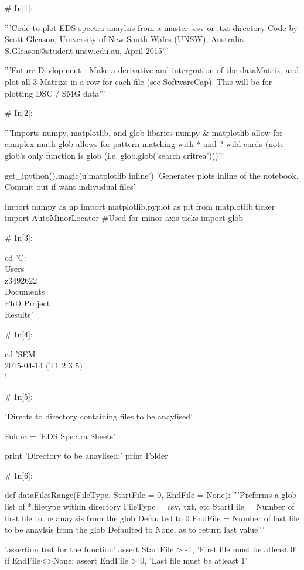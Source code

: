 \documentclass[a4paper,8pt]{article}
\begin{document}
\begin{python}
# In[1]:

'''Code to plot EDS spectra anaylsis from a master .csv or .txt directory
Code by Scott Gleason, University of New South Wales (UNSW), Australia 
S.Gleason@student.unsw.edu.au, April 2015'''

'''Future Devlopment - Make a derivative and intergration of the dataMatrix,
and plot all 3 Matrixs in a row for each file (see SoftwareCap). 
This will be for plotting DSC / SMG data'''


# In[2]:

'''Imports numpy, matplotlib, and glob libaries 
numpy & matplotlib allow for complex math
glob allows for pattern matching with * and ? wild cards
(note glob's only function is glob (i.e. glob.glob('search critrea')))'''

get_ipython().magic(u'matplotlib inline')
'Generates plots inline of the notebook. Commit out if want indivudual files'

import numpy as np
import matplotlib.pyplot as plt
from matplotlib.ticker import AutoMinorLocator #Used for minor axis ticks
import glob


# In[3]:

cd 'C:\\Users\\z3492622\\Documents\\PhD Project\\Results'


# In[4]:

cd 'SEM\\2015-04-14 (T1 2 3 5)\\'


# In[5]:

'Directs to directory containing files to be anaylised'

Folder = 'EDS Spectra Sheets'

print 'Directory to be anaylised:'
print Folder


# In[6]:

def dataFilesRange(FileType, StartFile = 0, EndFile = None):
'''Preforms a glob list of *.filetype within directory
FileType = csv, txt, etc
StartFile = Number of first file to be anaylsis from the glob
Defaulted to 0
EndFile = Number of last file to be anaylsis from the glob
Defaulted to None, as to return last value'''

'assertion test for the function'
assert StartFile > -1, 'First file must be atleast 0'
if EndFile<>None:
assert EndFile > 0, 'Last file must be atleast 1'


\end{python}
\end{document}
